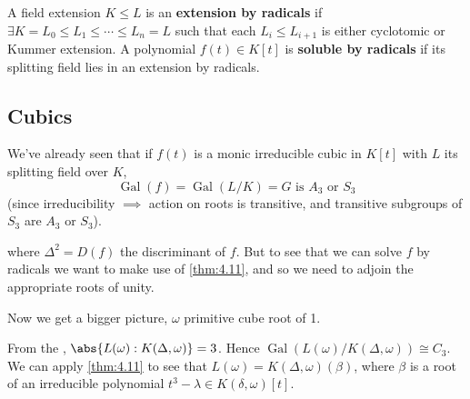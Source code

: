\documentclass{article}
\DeclareMathOperator{\Gal}{Gal}
\begin{document}
\begin{ndef}\label{def:4.14}
    A field extension $K \leq L$ is an \textbf{extension by radicals} if $\exists K = L_0 \leq L_1 \leq \dotsb \leq L_n = L$ such that each $L_i \leq L_{i+1}$ is either cyclotomic or Kummer extension.
    A polynomial $f(t) \in K[t]$ is \textbf{soluble by radicals} if its splitting field lies in an extension by radicals.
\end{ndef}

\subsection*{Cubics}
We've already seen that if $f(t)$ is a monic irreducible cubic in $K[t]$ with $L$ its splitting field over $K$,
\begin{equation*}
    \Gal(f) = \Gal(L/K) = G \text{ is } A_3 \text{ or } S_3
\end{equation*}
(since irreducibility $\implies$ action on roots is transitive, and transitive subgroups of $S_3$ are $A_3$ or $S_3$).

\begin{center}
\end{center}
where $\Delta^2 = D(f)$ the discriminant of $f$.
But to see that we can solve $f$ by radicals we want to make use of \cref{thm:4.11}, and so we need to adjoin the appropriate roots of unity.

Now we get a bigger picture, $\omega$ primitive cube root of 1.
\begin{center}
\end{center}
From the , $\abs{L(\omega):K(\Delta, \omega)} = 3$. Hence $\Gal(L(\omega)/K(\Delta, \omega)) \cong C_3$.
We can apply \cref{thm:4.11} to see that $L(\omega) = K(\Delta, \omega)(\beta)$, where $\beta$ is a root of an irreducible polynomial $t^3 - \lambda \in K(\delta, \omega)[t]$.
\end{document}

